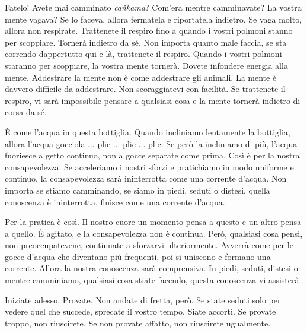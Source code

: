 Fatelo! Avete mai camminato \emph{caṅkama}? Com'era mentre camminavate?
La vostra mente vagava? Se lo faceva, allora fermatela e riportatela
indietro. Se vaga molto, allora non respirate. Trattenete il respiro
fino a quando i vostri polmoni stanno per scoppiare. Tornerà indietro da
sé. Non importa quanto male faccia, se sta correndo dappertutto qui e
là, trattenete il respiro. Quando i vostri polmoni staranno per
scoppiare, la vostra mente tornerà. Dovete infondere energia alla mente.
Addestrare la mente non è come addestrare gli animali. La mente è
davvero difficile da addestrare. Non scoraggiatevi con facilità. Se
trattenete il respiro, vi sarà impossibile pensare a qualsiasi cosa e la
mente tornerà indietro di corsa da sé.

È come l'acqua in questa bottiglia. Quando incliniamo lentamente la
bottiglia, allora l'acqua gocciola ... plic ... plic ... plic. Se però
la incliniamo di più, l'acqua fuoriesce a getto continuo, non a gocce
separate come prima. Così è per la nostra consapevolezza. Se acceleriamo
i nostri sforzi e pratichiamo in modo uniforme e continuo, la
consapevolezza sarà ininterrotta come una corrente d'acqua. Non importa
se stiamo camminando, se siamo in piedi, seduti o distesi, quella
conoscenza è ininterrotta, fluisce come una corrente d'acqua.

Per la pratica è così. Il nostro cuore un momento pensa a questo e un
altro pensa a quello. È agitato, e la consapevolezza non è continua.
Però, qualsiasi cosa pensi, non preoccupatevene, continuate a sforzarvi
ulteriormente. Avverrà come per le gocce d'acqua che diventano più
frequenti, poi si uniscono e formano una corrente. Allora la nostra
conoscenza sarà comprensiva. In piedi, seduti, distesi o mentre
camminiamo, qualsiasi cosa stiate facendo, questa conoscenza vi
assisterà.

Iniziate adesso. Provate. Non andate di fretta, però. Se state seduti
solo per vedere quel che succede, sprecate il vostro tempo. Siate
accorti. Se provate troppo, non riuscirete. Se non provate affatto, non
riuscirete ugualmente.

